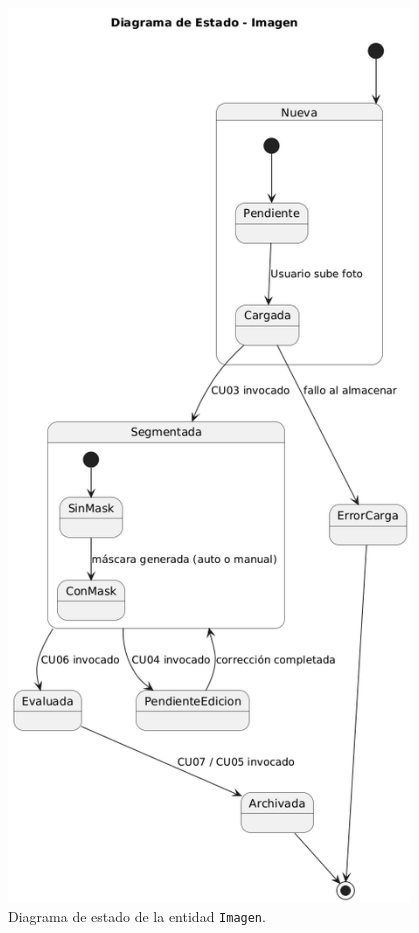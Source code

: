\begin{figure}[H]
  \centering
  \includegraphics[width=0.95\textwidth,height=0.5\textheight,keepaspectratio]{imagenes/estado_imagen.png}
  \caption{Diagrama de estado de la entidad \texttt{Imagen}.}
  \label{fig:estado_imagen}
\end{figure}

